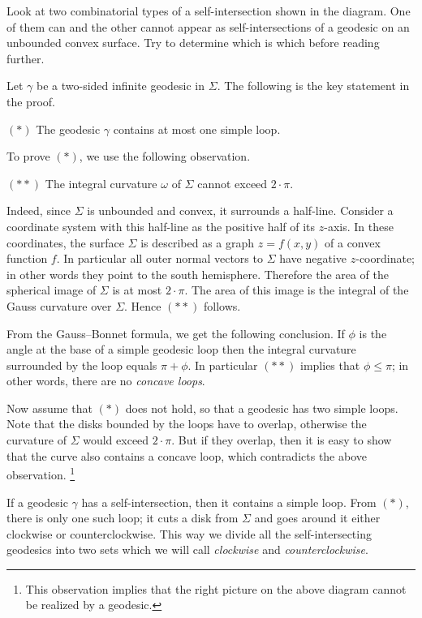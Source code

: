 Look at two combinatorial types of a self-intersection shown in the diagram.
One of them can and the other cannot appear as self-intersections of a geodesic on an unbounded convex surface.
Try to determine which is which before reading further.

\medskip

Let $\gamma$ be a two-sided infinite geodesic in $\Sigma$.
The following is the key statement in the proof.

\begin{cl}{$({*})$}
The geodesic $\gamma$ contains at most one simple loop.
\end{cl}

To prove $({*})$, we use the following observation.

\begin{cl}{$({*}{*})$}
The integral curvature $\omega$ of $\Sigma$ cannot exceed $2\cdot\pi$.
\end{cl}

Indeed, since $\Sigma$ is unbounded and convex,
it surrounds a half-line.
Consider a coordinate system with this half-line as the positive half of its $z$-axis. 
In these coordinates, the surface $\Sigma$ is described as a graph $z=f(x,y)$ of a convex function $f$.
In particular all outer normal vectors to $\Sigma$ have negative $z$-coordinate;
in other words they point to the south hemisphere.
Therefore the area of the spherical image of $\Sigma$ is at most $2\cdot\pi$.
The area of this image is the integral of the Gauss curvature over $\Sigma$. 
Hence $({*}{*})$ follows.

From the Gauss--Bonnet formula, we get the following conclusion.
If $\phi$ is the angle at the base of a simple geodesic loop then the integral curvature surrounded by the loop equals $\pi+\phi$. 
In particular $({*}{*})$ implies that $\phi\le\pi$; in other words, there are no \emph{concave loops}.

Now assume that $({*})$ does not hold, so that a geodesic has two simple loops.
Note that the disks bounded by the loops  have to overlap,
otherwise the curvature of $\Sigma$ would exceed $2\cdot\pi$.
But if they overlap, then it is easy to show that the curve also contains a concave loop, 
which contradicts the above observation.%
\footnote{This observation implies that the right picture on the above diagram cannot be realized by a geodesic.}

If a geodesic $\gamma$ has a self-intersection,
then it contains a simple loop.
From $({*})$, there is only one such loop;
it cuts a disk from $\Sigma$ 
and goes around it either clockwise or counterclockwise.
This way we divide all the self-intersecting geodesics 
into two sets which we will call {}\emph{clockwise} and {}\emph{counterclockwise}.


